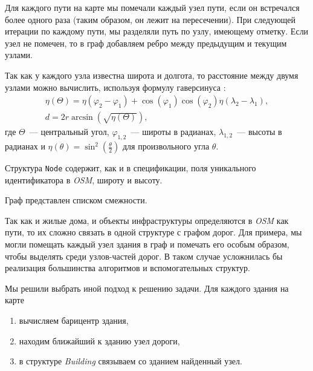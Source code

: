 \documentclass[11pt]{article}
\begin{document}
	
	
	Для каждого пути на карте мы помечали каждый узел пути, если он встречался более одного раза (таким образом, он лежит на пересечении).
	При следующей итерации по каждому пути, мы разделяли путь по узлу, имеющему отметку.
	Если узел не помечен, то в граф добавляем ребро между предыдущим и текущим узлами.
	
	Так как у каждого узла известна широта и долгота, то расстояние между двумя узлами можно вычислить, используя формулу гаверсинуса \cite{haversine}:
\begin{gather*}
	\eta(\Theta) = \eta(\varphi_2 - \varphi_1) + \cos(\varphi_1) \cos(\varphi_2) \eta(\lambda_2 - \lambda_1), \\
	d = 2r \arcsin(\sqrt{\eta(\Theta)}),
\end{gather*}
	где $ \Theta $~--- центральный угол, $ \varphi_{1,2} $~--- широты в радианах, $ \lambda_{1,2} $~--- высоты в радианах и $ \eta(\theta) = \sin^2 \left(\frac{\theta}{2}\right) $ для произвольного угла $ \theta $.
	
	
 	
	Структура \texttt{Node} содержит, как и в спецификации, поля уникального идентификатора в \textit{OSM}, широту и высоту.
 	
	
 	
 	Граф представлен списком смежности.
 	
 	
 	
 	Так как и жилые дома, и объекты инфраструктуры определяются в \textit{OSM} как пути, то их сложно связать в одной структуре с графом дорог.
 	Для примера, мы могли помещать каждый узел здания в граф и помечать его особым образом, чтобы выделять среди узлов-частей дорог.
 	В таком случае усложнилась бы реализация большинства алгоритмов и вспомогательных структур.
 	
 	Мы решили выбрать иной подход к решению задачи.
	Для каждого здания на карте
	\begin{enumerate}
	\item вычисляем барицентр здания,
	\item находим ближайший к зданию узел дороги,
	\item в структуре \textit{Building} связываем со зданием найденный узел.
	\end{enumerate}
	
	
	
\end{document}
